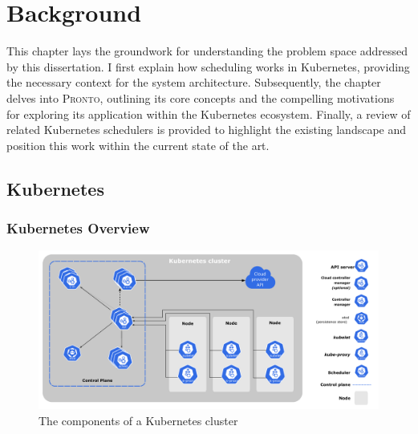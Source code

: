 \chapter{Background}

%
%
This chapter lays the groundwork for understanding the problem space addressed
by this dissertation. I first explain how scheduling works in Kubernetes,
providing the necessary context for the system architecture. Subsequently, the
chapter delves into \textsc{Pronto}, outlining its core concepts and the
compelling motivations for exploring its application within the Kubernetes
ecosystem. Finally, a review of related Kubernetes schedulers is provided to
highlight the existing landscape and position this work within the current state
of the art.

\section{Kubernetes}

\subsection{Kubernetes Overview}

\begin{figure}[ht]
    \centering
    \includegraphics[width=\textwidth]{images/components-of-kubernetes.pdf}
    \caption{The components of a Kubernetes cluster~\cite{kubernetes-components}}
    \label{kube-components}
\end{figure}

